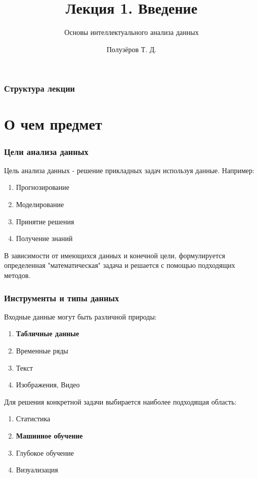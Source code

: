 \documentclass{beamer}
\title{Лекция 1. Введение}
\subtitle{Основы интеллектуального анализа данных}
\author{Полузёров Т. Д.}
\institute{БГУ ФПМИ}
\date{}
\begin{document}
	
	
	\begin{frame}
		\titlepage
	\end{frame}
	
	
	\begin{frame}
		\frametitle{Структура лекции}
		\tableofcontents
	\end{frame}


	\section{О чем предмет}
	
	
	\begin{frame}
		\frametitle{Цели анализа данных}
		Цель анализа данных - решение прикладных задач используя данные.
		Например:
		\begin{enumerate}
			\item Прогнозирование
			\item Моделирование
			\item Принятие решения
			\item Получение знаний
		\end{enumerate}
	
		\vspace{10pt}
		В зависимости от имеющихся данных и конечной цели, формулируется определенная "математическая" задача и решается с помощью подходящих методов.
	\end{frame}


	\begin{frame}
		\frametitle{Инструменты и типы данных}
		Входные данные могут быть различной природы:
		\begin{enumerate}
			\item \textbf{Табличные данные}
			\item Временные ряды
			\item Текст
			\item Изображения, Видео
		\end{enumerate}
		
		\vspace{15pt}
		
		Для решения конкретной задачи выбирается наиболее подходящая область:
		\begin{enumerate}
			\item Статистика
			\item \textbf{Машинное обучение} 
			\item Глубокое обучение 
			\item Визуализация
		\end{enumerate}
	\end{frame}
	
\end{document}
